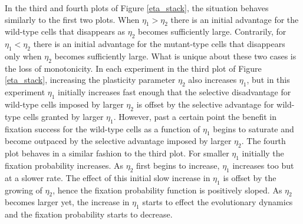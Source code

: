 \documentclass[12pt]{article}
\begin{document}
In the third and fourth plots of Figure \ref{eta_stack}, the situation behaves similarly to the first two plots. When $\eta_1>\eta_2$ there is an initial advantage for the wild-type cells that disappears as $\eta_2$ becomes sufficiently large. Contrarily, for $\eta_1<\eta_2$ there is an initial advantage for the mutant-type cells that disappears only when $\eta_2$ becomes sufficiently large. What is unique about these two cases is the loss of monotonicity. In each experiment in the third plot of Figure \ref{eta_stack}, increasing the plasticity parameter $\eta_2$ also increases $\eta_1$, but in this experiment $\eta_1$ initially increases fast enough that the selective disadvantage for wild-type cells imposed by larger $\eta_2$ is offset by the selective advantage for wild-type cells granted by larger $\eta_1$. However, past a certain point the benefit in fixation success for the wild-type cells as a function of $\eta_1$ begins to saturate and become outpaced by the selective advantage imposed by larger $\eta_2$. The fourth plot behaves in a similar fashion to the third plot. For smaller $\eta_1$ initially the fixation probability increases. As $\eta_2$ first begins to increase, $\eta_1$ increases too but at a slower rate. The effect of this initial slow increase in $\eta_1$ is offset by the growing of $\eta_2$, hence the fixation probability function is positively sloped. As $\eta_2$ becomes larger yet, the increase in $\eta_1$ starts to effect the evolutionary dynamics and the fixation probability starts to decrease.
\end{document}
